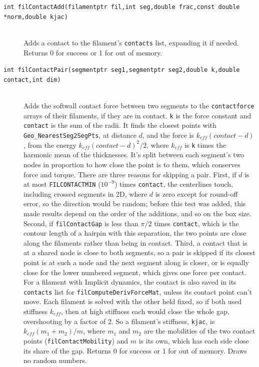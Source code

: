 \documentclass {scrbook}
\newcommand {\ttt} {\texttt}
\begin{document}
\begin{description}
\item[\ttt{int filContactAdd(filamentptr fil,int seg,double frac,const double *norm,double kjac)}] %
\hfill \\
Adds a contact to the filament's \ttt{contacts} list, expanding it if needed. Returns 0 for success or 1 for out of memory.

\item[\ttt{int filContactPair(segmentptr seg1,segmentptr seg2,double k,double contact,int dim)}] %
\hfill \\
Adds the softwall contact force between two segments to the \ttt{contactforce} arrays of their filaments, if they are in contact. \ttt{k} is the force constant and \ttt{contact} is the sum of the radii. It finds the closest points with \ttt{Geo\_NearestSeg2SegPts}, at distance $d$, and the force is $k_{eff}(contact-d)$, from the energy $k_{eff}(contact-d)^2/2$, where $k_{eff}$ is \ttt{k} times the harmonic mean of the thicknesses. It's split between each segment's two nodes in proportion to how close the point is to them, which conserves force and torque. There are three reasons for skipping a pair. First, if $d$ is at most \ttt{FILCONTACTMIN} ($10^{-9}$) times \ttt{contact}, the centerlines touch, including crossed segments in 2D, where $d$ is zero except for round-off error, so the direction would be random; before this test was added, this made results depend on the order of the additions, and so on the box size. Second, if \ttt{filContactGap} is less than $\pi/2$ times \ttt{contact}, which is the contour length of a hairpin with this separation, the two points are close along the filaments rather than being in contact. Third, a contact that is at a shared node is close to both segments, so a pair is skipped if its closest point is at such a node and the next segment along is closer, or is equally close for the lower numbered segment, which gives one force per contact. For a filament with Implicit dynamics, the contact is also saved in its \ttt{contacts} list for \ttt{filComputeDerivForceMat}, unless its contact point can't move. Each filament is solved with the other held fixed, so if both used stiffness $k_{eff}$, then at high stiffness each would close the whole gap, overshooting by a factor of 2. So a filament's stiffness, \ttt{kjac}, is $k_{eff}(m_1+m_2)/m$, where $m_1$ and $m_2$ are the mobilities of the two contact points (\ttt{filContactMobility}) and $m$ is its own, which has each side close its share of the gap. Returns 0 for success or 1 for out of memory. Draws no random numbers.


\end{description}
\end{document}
